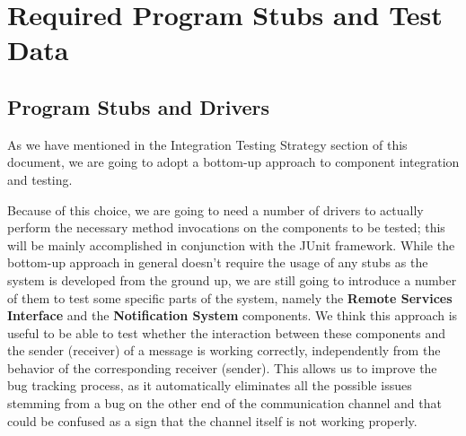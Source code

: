 \chapter{Required Program Stubs and Test Data}
\section{Program Stubs and Drivers}
As we have mentioned in the Integration Testing Strategy section of this document, we are going to adopt a bottom-up approach to component integration and testing.

Because of this choice, we are going to need a number of drivers to actually perform the necessary method invocations on the components to be tested; this will be mainly accomplished in conjunction with the JUnit framework. While the bottom-up approach in general doesn't require the usage of any stubs as the system is developed from the ground up, we are still going to introduce a number of them to test some specific parts of the system, namely the \textbf{Remote Services Interface} and the \textbf{Notification System} components. We think this approach is useful to be able to test whether the interaction between these components and the sender (receiver) of a message is working correctly, independently from the behavior of the corresponding receiver (sender). This allows us to improve the bug tracking process, as it automatically eliminates all the possible issues stemming from a bug on the other end of the communication channel and that could be confused as a sign that the channel itself is not working properly. 

